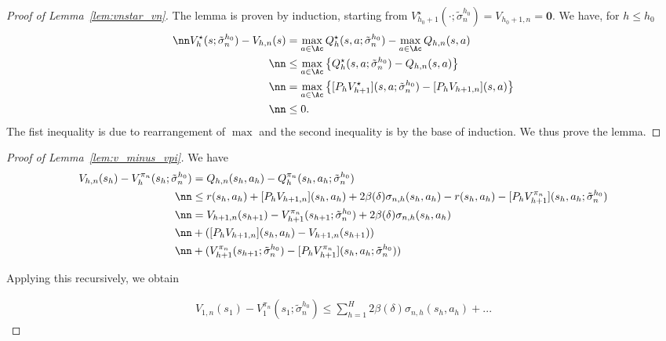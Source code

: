 \begin{proof}[Proof of Lemma~\ref{lem:vnstar_vn}]

    
    The lemma is proven by induction, starting from $V^{\star}_{h_0+1}(\cdot; \tilde{\sigma}^{h_0}_{ n})=V_{h_0+1,n}=\bm{0}$. We have, for $h\le h_0$
    \begin{align}\nn
        V^{\star}_{h}(s; \tilde{\sigma}^{h_0}_{ n})-V_{h,n}(s) &= \max_{a\in\Ac} Q^{\star}_{h}(s,a; \tilde{\sigma}^{h_0}_{ n})-\max_{a\in\Ac}Q_{h,n}(s,a)\\\nn
        &\le \max_{a\in\Ac} \left\{Q^{\star}_{h}(s,a; \tilde{\sigma}^{h_0}_{ n})-Q_{h,n}(s,a)\right\}\\\nn
        & =\max_{a\in\Ac} \left\{[P_hV^{\star}_{h+1}](s,a; \tilde{\sigma}^{h_0}_{ n})-[P_hV_{h+1,n}](s,a)\right\}\\\nn
        &\le 0. 
    \end{align}
    The fist inequality is due to rearrangement of $\max$ and the second inequality is by the base of induction. We thus prove the lemma. 
\end{proof}


\begin{proof}[Proof of Lemma~\ref{lem:v_minus_vpi}]
We have
\begin{align}
    V_{h,n}(s_h)- V^{\pi_n}_h(s_h; \tilde{\sigma}^{h_0}_n)
    &=
    Q_{h,n}(s_h, a_h)- Q^{\pi_n}_h(s_h, a_h; \tilde{\sigma}^{h_0}_n)\\\nn &\le r(s_h, a_h) + [P_hV_{h+1,n}](s_h, a_h) + 2\beta(\delta)\sigma_{n,h}(s_h, a_h)- r(s_h, a_h) - [P_hV^{\pi_n}_{h+1}](s_h, a_h; \tilde{\sigma}^{h_0}_n)\\\nn
    &= V_{h+1, n}(s_{h+1}) - V^{\pi_n}_{h+1}(s_{h+1}; \tilde{\sigma}^{h_0}_n)+ 2\beta(\delta)\sigma_{n,h}(s_h, a_h) \\\nn
    &+ ([P_hV_{h+1,n}](s_h, a_h) - V_{h+1, n}(s_{h+1})) \\\nn
    & + (V^{\pi_n}_{h+1}(s_{h+1}; \tilde{\sigma}^{h_0}_n) - [P_hV^{\pi_n}_{h+1}](s_h, a_h; \tilde{\sigma}^{h_0}_n))
\end{align}

Applying this recursively, we obtain

\begin{align}
    V_{1,n}(s_1)- V^{\pi_n}_1(s_1; \tilde{\sigma}^{h_0}_n) \le \sum_{h=1}^H 2\beta(\delta)\sigma_{n,h}(s_h, a_h) + ...
\end{align}
    
\end{proof}
